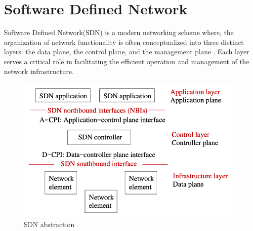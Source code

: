 \section{Software Defined Network}
Software Defined Network(SDN) is a modern networking scheme where, the organization of network functionality is often conceptualized into three distinct layers: the data plane, the control plane, and the management plane \cite{kreutz2014software}. Each layer serves a critical role in facilitating the efficient operation and management of the network infrastructure.

\begin{figure}[h]
  \centering
  \includegraphics[width=0.8\columnwidth]{figs/sdn.png}
  \caption{SDN abstraction }
  \label{fig:sdn_abs}
\end{figure}


